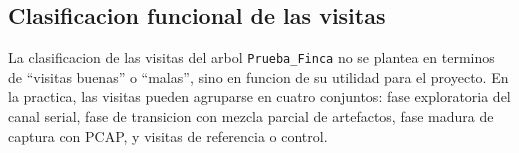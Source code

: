 %
% 

\subsection{Clasificacion funcional de las visitas}

La clasificacion de las visitas del arbol \texttt{Prueba\_Finca} no se plantea
en terminos de ``visitas buenas'' o ``malas'', sino en funcion de su utilidad
para el proyecto. En la practica, las visitas pueden agruparse en cuatro
conjuntos: fase exploratoria del canal serial, fase de transicion con mezcla
parcial de artefactos, fase madura de captura con PCAP, y visitas de referencia
o control.

